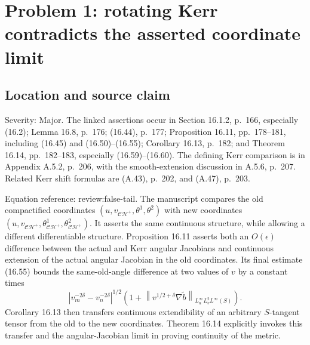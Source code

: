 \documentclass[10pt]{article}
\begin{document}
\section*{Problem 1: rotating Kerr contradicts the asserted coordinate limit}
\subsection*{Location and source claim}
Severity: Major. The linked assertions occur in Section 16.1.2, p. 166, especially (16.2); Lemma 16.8, p. 176; (16.44), p. 177; Proposition 16.11, pp. 178–181, including (16.45) and (16.50)–(16.55); Corollary 16.13, p. 182; and Theorem 16.14, pp. 182–183, especially (16.59)–(16.60). The defining Kerr comparison is in Appendix A.5.2, p. 206, with the smooth-extension discussion in A.5.6, p. 207. Related Kerr shift formulas are (A.43), p. 202, and (A.47), p. 203.\par
Equation reference: review:false-tail. The manuscript compares the old compactified coordinates \((u,v_{\mathcal{CH}^{+}},\theta^1,\theta^2)\) with new coordinates \((u,v_{\mathcal{CH}^{+}},\theta^1_{\mathcal{CH}^{+}},\theta^2_{\mathcal{CH}^{+}})\). It asserts the same continuous structure, while allowing a different differentiable structure. Proposition 16.11 asserts both an \(O(\epsilon)\) difference between the actual and Kerr angular Jacobians and continuous extension of the actual angular Jacobian in the old coordinates. Its final estimate (16.55) bounds the same-old-angle difference at two values of \(v\) by a constant times \[
 |v_m^{-2\delta}-v_n^{-2\delta}|^{1/2}
 \left(1+\left\lVert v^{1/2+\delta}\nabla\widetilde b\right\rVert
                _{L^\infty_uL^2_vL^\infty(S)}\right).\] Corollary 16.13 then transfers continuous extendibility of an arbitrary \(S\)-tangent tensor from the old to the new coordinates. Theorem 16.14 explicitly invokes this transfer and the angular-Jacobian limit in proving continuity of the metric.\par
\end{document}
